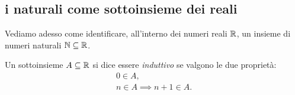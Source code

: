 
\subsection{i naturali come sottoinsieme dei reali}

Vediamo adesso come identificare, all'interno dei numeri reali ${\mathbb R}$,
un insieme di numeri naturali $\NN \subset \RR$.

\begin{definition}%
  \label{def:induttivo}%
  \mymargin{$\NN\subset \RR$}%
  Un sottoinsieme $A\subseteq {\mathbb R}$ si dice essere \emph{induttivo}
  se valgono le due proprietà:
  \begin{gather*}
    0 \in A, \\
    n\in A \implies n+1 \in A.
  \end{gather*}
\end{definition}

